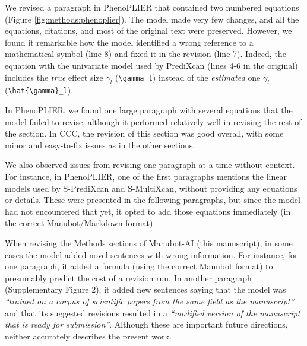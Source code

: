 \documentclass[
]{article}
\begin{document}
We revised a paragraph in PhenoPLIER that contained two numbered equations (Figure \ref{fig:methods:phenoplier}).
The model made very few changes, and all the equations, citations, and most of the original text were preserved.
However, we found it remarkable how the model identified a wrong reference to a mathematical symbol (line 8) and fixed it in the revision (line 7).
Indeed, the equation with the univariate model used by PrediXcan (lines 4-6 in the original) includes the \emph{true} effect size \(\gamma_l\) (\texttt{\textbackslash{}gamma\_l}) instead of the \emph{estimated} one \(\hat{\gamma}_l\) (\texttt{\textbackslash{}hat\{\textbackslash{}gamma\}\_l}).

In PhenoPLIER, we found one large paragraph with several equations that the model failed to revise, although it performed relatively well in revising the rest of the section.
In CCC, the revision of this section was good overall, with some minor and easy-to-fix issues as in the other sections.

We also observed issues from revising one paragraph at a time without context.
For instance, in PhenoPLIER, one of the first paragraphs mentions the linear models used by S-PrediXcan and S-MultiXcan, without providing any equations or details.
These were presented in the following paragraphs, but since the model had not encountered that yet, it opted to add those equations immediately (in the correct Manubot/Markdown format).

% 

When revising the Methods sections of Manubot-AI (this manuscript), in some cases the model added novel sentences with wrong information.
For instance, for one paragraph, it added a formula (using the correct Manubot format) to presumably predict the cost of a revision run.
In another paragraph (Supplementary Figure 2), it added new sentences saying that the model was \emph{``trained on a corpus of scientific papers from the same field as the manuscript''} and that its suggested revisions resulted in a \emph{``modified version of the manuscript that is ready for submission''}.
Although these are important future directions, neither accurately describes the present work.
\end{document}
